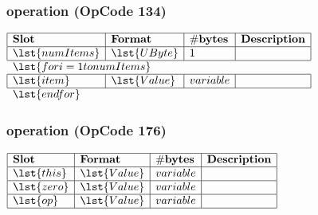  \subsubsection{ operation (OpCode 134)}

 \noindent
 \(\begin{array}{| l | l | l | l |}
     \hline
     \bf{Slot} & \bf{Format} & \bf{\#bytes} & \bf{Description} \\
     \hline
     \lst{numItems} & \lst{UByte} & 1 &  \\
     \hline
     \multicolumn{4}{l}{\lst{for i=1 to numItems}} \\
     \hline
     \lst{item} & \lst{Value} & variable &  \\
     \hline
     \multicolumn{4}{l}{\lst{end for}} \\
  \end{array}\)

 \subsubsection{ operation (OpCode 176)}

 \noindent
 \(\begin{array}{| l | l | l | l |}
     \hline
     \bf{Slot} & \bf{Format} & \bf{\#bytes} & \bf{Description} \\
     \hline
     \lst{this} & \lst{Value} & variable &  \\
     \hline
     \lst{zero} & \lst{Value} & variable &  \\
     \hline
     \lst{op} & \lst{Value} & variable &  \\
     \hline
  \end{array}\)

